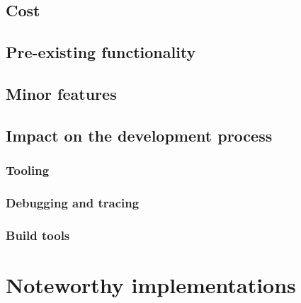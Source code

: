\subsection{Cost}
\subsection{Pre-existing functionality}
\subsection{Minor features}
\subsection{Impact on the development process}
\subsubsection{Tooling}
\subsubsection{Debugging and tracing}
\subsubsection{Build tools}


\section{Noteworthy implementations}